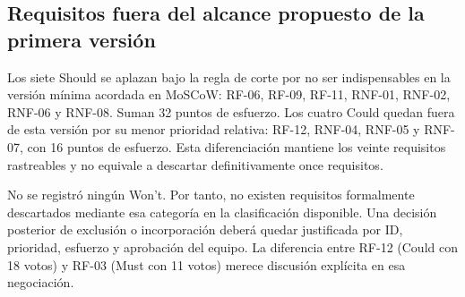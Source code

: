 \subsection{Requisitos fuera del alcance propuesto de la primera versión}

Los siete Should se aplazan bajo la regla de corte por no ser indispensables en la versión mínima acordada en MoSCoW: RF-06, RF-09, RF-11, RNF-01, RNF-02, RNF-06 y RNF-08. Suman 32 puntos de esfuerzo. Los cuatro Could quedan fuera de esta versión por su menor prioridad relativa: RF-12, RNF-04, RNF-05 y RNF-07, con 16 puntos de esfuerzo. Esta diferenciación mantiene los veinte requisitos rastreables y no equivale a descartar definitivamente once requisitos.

No se registró ningún Won't. Por tanto, no existen requisitos formalmente descartados mediante esa categoría en la clasificación disponible. Una decisión posterior de exclusión o incorporación deberá quedar justificada por ID, prioridad, esfuerzo y aprobación del equipo. La diferencia entre RF-12 (Could con 18 votos) y RF-03 (Must con 11 votos) merece discusión explícita en esa negociación.
